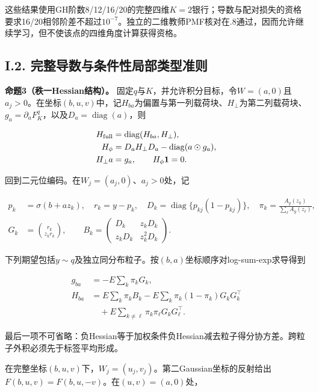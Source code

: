 \documentclass[11pt,a4paper]{article}
\begin{document}
这些结果使用GH阶数8/12/16/20的完整四维\(K=2\)银行；导数与配对损失的资格要求16/20相邻阶差不超过\(10^{-7}\)。独立的二维教师PMF核对在\(.8\)通过，因而允许继续学习，但不使该点的四维角度计算获得资格。

\subsection*{I.2. 完整导数与条件性局部类型准则}\label{full-derivatives}

\protect{}\label{full-hessian-criterion}
\textbf{命题3（秩一Hessian结构）。}
固定\(q\)与\(K\)，并允许积分目标，令\(W=(a,0)\)且\(a_j>0\)。在坐标\((b,u,v)\)中，记\(H_{ba}\)为偏置与第一列载荷块、\(H_\perp\)为第二列载荷块、\(g_a=\partial_a F_K^q\)，以及\(D_a=\operatorname{diag}(a)\)，则

\[
\begin{aligned}
H_{\rm full}&=\operatorname{diag}(H_{ba},H_\perp),\\
H_\phi&=D_aH_\perp D_a-\operatorname{diag}(a\odot g_a),\\
H_\perp a&=g_a,\qquad H_\phi\mathbf1=0.
\end{aligned}
\]

回到二元位编码。在\(W_j=(a_j,0)\)、\(a_j>0\)处，记

\[
\begin{aligned}
p_k&=\sigma(b+az_k),\quad r_k=y-p_k,\quad D_k=\operatorname{diag}\{p_{kj}(1-p_{kj})\},
\quad\pi_k=\frac{A_y(z_k)}{\sum_\ell A_y(z_\ell)},\\
G_k&=\binom{r_k}{z_kr_k},\qquad
B_k=\begin{pmatrix}D_k&z_kD_k\\z_kD_k&z_k^2D_k\end{pmatrix}.
\end{aligned}
\tag{I.6}
\]

下列期望包括\(y\sim q\)及独立同分布粒子。按\((b,a)\)坐标顺序对log-sum-exp求导得到

\[
\begin{aligned}
g_{ba}&=-E\sum_k\pi_kG_k,\\
H_{ba}&=E\sum_k\pi_kB_k-E\sum_k\pi_k(1-\pi_k)G_kG_k^\top\\
&\quad+E\sum_{k\ne\ell}\pi_k\pi_\ell G_kG_\ell^\top.
\end{aligned}
\tag{I.7}
\]

最后一项不可省略：负Hessian等于加权条件负Hessian减去粒子得分协方差。跨粒子外积必须先于标签平均形成。

在完整坐标\((b,u,v)\)下，\(W_j=(u_j,v_j)\)。第二Gaussian坐标的反射给出\(F(b,u,v)=F(b,u,-v)\)。在\((u,v)=(a,0)\)处，
\end{document}
